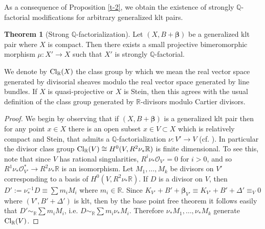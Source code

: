 \documentclass[11pt]{amsart}
\numberwithin{equation}{section}
\def\bbeta{\boldsymbol{\beta}}
\def\OO{\mathcal O}
\newcommand\Q{{\mathbb{Q}}}
\newcommand\R{{\mathbb{R}}}
\theoremstyle{definition}
\theoremstyle{definition}
\newtheorem{theorem}{Theorem}[section]
\theoremstyle{definition}
\begin{document}
 As a consequence of Proposition \ref{t-2}, we obtain the existence of strongly $\Q$-factorial modifications for arbitrary generalized klt pairs.
\begin{theorem}[Strong $\Q$-factorialization]\label{t-3} Let $(X,B+\bbeta)$ be a generalized klt pair where $X$ is compact. Then there exists a small projective bimeromorphic morphism $\mu :X'\to X$ such that $X'$ is strongly $\Q$-factorial.
\end{theorem}
We denote by ${\rm Cl}_\R(X)$ the class group by which we mean the real vector space generated by divisorial sheaves modulo the real vector space generated by line bundles. If $X$ is quasi-projective or $X$ is Stein, then this agrees with the usual definition of the class group generated by $\R$-divisors modulo Cartier divisors. 
\begin{proof} We begin by observing that if $(X,B+\bbeta)$ is a generalized klt pair then for any point $x\in X$ there is an open subset $x\in V\subset X$ which is relatively compact and Stein, that admits a $\Q$-factorialization $\nu:V'\to V$ (cf. \cite[Theorem 1.24]{Fuj22}). In particular the divisor class group ${\rm Cl}_\R(V)\cong H^0(V,R^2\nu _*\R)$ is finite dimensional. To see this, note that since $V$ has rational singularities, $R^i\nu _*\OO _{V'}=0$ for $i>0$, and so $R^1\nu_*\OO _{V'}^*\to R^2\nu_*\R$ is an isomorphism. Let $M_1,\ldots , M_k$ be divisors on $V'$ corresponding to a basis of $H^0(V,R^2\nu _*\R)$.
If $D$ is a divisor on $V$, then $D':=\nu ^{-1}_*D\equiv \sum m_iM_i$ where $m_i\in \R$.
Since $K_{V'}+B'+\bbeta _{V'}\equiv K_{V'}+B'+\Delta'\equiv _V0$ where $(V',B'+\Delta ')$ is klt, then by the base point free theorem it follows easily that $D'\sim_\R\sum m_iM_i$, i.e. $D\sim_\R \sum m_i\nu _*M_i$. Therefore $\nu _* M_1,\ldots , \nu _* M_k$ generate ${\rm Cl}_{\R}(V)$.



\end{proof}
\end{document}
